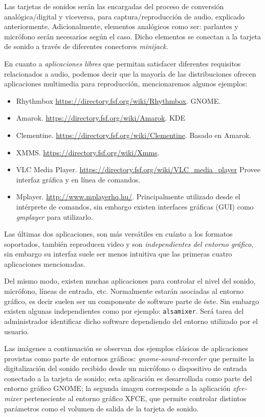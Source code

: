 \documentclass[12pt]{article}
\begin{document}
Las tarjetas de sonidos serán las encargadas del proceso de conversión 
analógica/digital y viceversa, para captura/reproducción de audio, explicado 
anteriormente. Adicionalmente, elementos analógicos como ser: parlantes y 
micrófono serán necesarios según el caso. Dicho elementos se conectan 
a la tarjeta de sonido a través de diferentes conectores {\it minijack}.  

En cuanto a {\it aplicaciones libres} que permitan satisfacer diferentes
requisitos relacionados a audio, podemos decir que la mayoría de las distribuciones
ofrecen aplicaciones multimedia para reproducción, mencionaremos algunos 
ejemplos:

\begin{itemize}
\item Rhythmbox \url{https://directory.fsf.org/wiki/Rhythmbox}. GNOME. 
\item Amarok. \url{https://directory.fsf.org/wiki/Amarok}. KDE 
\item Clementine. \url{https://directory.fsf.org/wiki/Clementine}. 
Basado en Amarok. 
\item XMMS. \url{https://directory.fsf.org/wiki/Xmms}. 
\item VLC Media Player. \url{https://directory.fsf.org/wiki/VLC_media_player}
Provee interfaz gráfica y en línea de comandos. 
\item Mplayer. \url{http://www.mplayerhq.hu/}. Principalmente utilizado 
desde el intérprete de comandos, sin embargo existen interfaces gráficas
(GUI) como {\it gmplayer} para utilizarlo. 
\end{itemize}

Las últimas dos aplicaciones, son más versátiles en cuánto a los formatos soportados, 
también reproducen video y son {\it independientes del entorno gráfico}, sin embargo 
su interfaz suele ser menos intuitiva que las primeras cuatro aplicaciones 
mencionadas. 
 
Del mismo modo, existen muchas aplicaciones para controlar el nivel del sonido, micrófono, 
líneas de entrada, etc. Normalmente estarán asociadas al entorno gráfico, es decir suelen ser
un componente de software parte de éste. Sin embargo existen algunas independientes como por ejemplo:
{\tt alsamixer}. Será tarea del administrador identificar dicho software dependiendo 
del entorno utilizado por el usuario. 

Las imágenes a continuación se observan dos ejemplos clásicos de aplicaciones provistas
como parte de entornos gráficos: {\it gnome-sound-recorder} que permite la 
digitalización del sonido recibido desde un micrófono o dispositivo de 
entrada conectado a la tarjeta de sonido; esta aplicación es desarrollada como 
parte del entorno gráfico GNOME; la segunda imagen corresponde a la aplicación 
{\it xfce-mixer} perteneciente al entorno gráfico XFCE, que permite controlar 
distintos parámetros como el volumen de salida de la tarjeta de sonido. 
\end{document}
